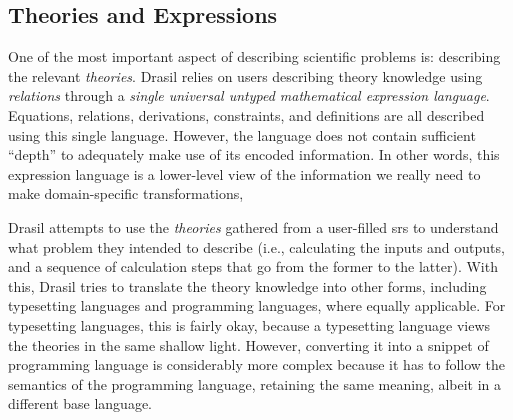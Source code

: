 \subsection{Theories and Expressions}

One of the most important aspect of describing scientific problems is:
describing the relevant \textit{theories}. Drasil relies on users describing
theory knowledge using \textit{relations} through a \textit{single universal
      untyped mathematical expression language}. Equations, relations, derivations,
constraints, and definitions are all described using this single language.
However, the language does not contain sufficient ``depth'' to adequately make
use of its encoded information. In other words, this expression language is a
lower-level view of the information we really need to make domain-specific
transformations,

Drasil attempts to use the \textit{theories} gathered from a user-filled
\acs{srs} to understand what problem they intended to describe (i.e.,
calculating the inputs and outputs, and a sequence of calculation steps that go
from the former to the latter). With this, Drasil tries to translate the theory
knowledge into other forms, including typesetting languages and programming
languages, where equally applicable. For typesetting languages, this is fairly
okay, because a typesetting language views the theories in the same shallow
light. However, converting it into a snippet of programming language is
considerably more complex because it has to follow the semantics of the
programming language, retaining the same meaning, albeit in a different base
language.


